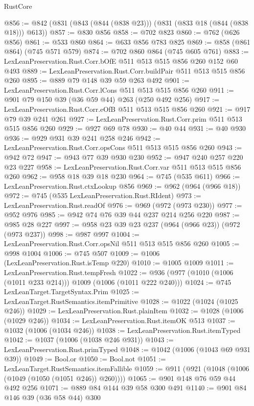 \begin{lexlean}{RustCore}
\begin{coremodule}
@856 := @842 (@831 (@843 (@844 (@838 @23))) (@831 (@833 @18 (@844 (@838 @18))) @613))
@857 := @830 @856
@858 := @702 @823
@860 := @762 (@626 @856)
@861 := @533 @860
@864 := @633 @856 @783 @825
@869 := @858 (@861 @864) (@745 @571 @579)
@874 := @702 @860 @864 (@745 @605 @761)
@883 := LexLeanPreservation.Rust.Corr.bOfE @511 @513 @515 @856 @260 @152 @60 @493
@889 := LexLeanPreservation.Rust.Corr.buildPair @511 @513 @515 @856 @260
@895 := @889 @79 @148 @39 @59 @263 @492
@901 := LexLeanPreservation.Rust.Corr.lCons @511 @513 @515 @856 @260
@911 := @901 @79 @150 @39 (@36 @59 @44) @263 (@250 @492 @256)
@917 := LexLeanPreservation.Rust.Corr.eOfB @511 @513 @515 @856 @260
@921 := @917 @79 @39 @241 @261
@927 := LexLeanPreservation.Rust.Corr.prim @511 @513 @515 @856 @260
@929 := @927 @69 @78
@930 := @40 @44
@931 := @40 @930
@936 := @929 @931 @39 @241 @258 @246
@942 := LexLeanPreservation.Rust.Corr.opsCons @511 @513 @515 @856 @260
@943 := @942 @72
@947 := @943 @77 @39 @930 @230
@952 := @947 @240 @257 @220 @23 @227
@958 := LexLeanPreservation.Rust.Corr.var @511 @513 @515 @856 @260
@962 := @958 @18 @39 @18 @230
@964 := @745 (@535 @611)
@966 := LexLeanPreservation.Rust.ctxLookup @856
@969 := @962 (@964 (@966 @18))
@972 := @745 (@535 LexLeanPreservation.Rust.RIdent)
@973 := LexLeanPreservation.Rust.readOf
@976 := @969 (@972 (@973 @230))
@977 := @952 @976
@985 := @942 @74 @76 @39 @44 @237 @214 @256 @220
@987 := @985 @28 @227
@997 := @958 @23 @39 @23 @237 (@964 (@966 @23)) (@972 (@973 @237))
@998 := @987 @997
@1004 := LexLeanPreservation.Rust.Corr.opsNil @511 @513 @515 @856 @260
@1005 := @998 @1004
@1006 := @745 @507
@1009 := @1006 (LexLeanPreservation.Rust.isTemp @220)
@1010 := @1005 @1009
@1011 := LexLeanPreservation.Rust.tempFresh
@1022 := @936 (@977 (@1010 (@1006 (@1011 @233 @214))) @1009 (@1006 (@1011 @222 @240)))
@1024 := @745 LexLeanTarget.TargetSyntax.Prim
@1025 := LexLeanTarget.RustSemantics.itemPrimitive
@1028 := @1022 (@1024 (@1025 @246))
@1029 := LexLeanPreservation.Rust.plainItem
@1032 := @1028 (@1006 (@1029 @246))
@1034 := LexLeanPreservation.Rust.itemOK @513
@1037 := @1032 (@1006 (@1034 @246))
@1038 := LexLeanPreservation.Rust.itemTyped
@1042 := @1037 (@1006 (@1038 @246 @931))
@1043 := LexLeanPreservation.Rust.primTyped
@1048 := @1042 (@1006 (@1043 @69 @931 @39))
@1049 := Bool.or
@1050 := Bool.not
@1051 := LexLeanTarget.RustSemantics.itemFallible
@1059 := @911 (@921 (@1048 (@1006 (@1049 (@1050 (@1051 @246)) @260))))
@1065 := @901 @148 @76 @59 @44 @492 @256
@1071 := @889 @84 @144 @39 @58 @300 @491
@1140 := @901
    @84
    @146
    @39
    (@36 @58 @44)
    @300

\end{coremodule}
\end{lexlean}
